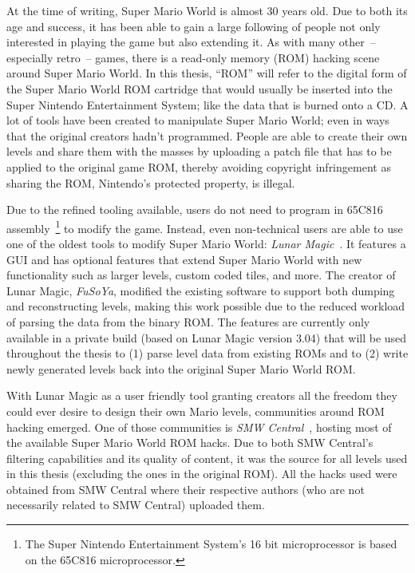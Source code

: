 At the time of writing, Super Mario World is almost 30 years old. Due
to both its age and success, it has been able to gain a large
following of people not only interested in playing the game but also
extending it. As with many other~-- especially retro~-- games, there
is a read-only memory (ROM) hacking scene around Super Mario World. In
this thesis, ``ROM'' will refer to the digital form of the Super Mario
World ROM cartridge that would usually be inserted into the Super
Nintendo Entertainment System; like the data that is burned onto a CD.
A lot of tools have been created to manipulate Super Mario World; even
in ways that the original creators hadn't programmed. People are able
to create their own levels and share them with the masses by uploading
a patch file that has to be applied to the original game ROM, thereby
avoiding copyright infringement as sharing the ROM, Nintendo's
protected property, is illegal.

Due to the refined tooling available, users do not need to program in
65C816 assembly~\footnote{The Super Nintendo Entertainment System's 16
  bit microprocessor is based on the 65C816 microprocessor.} to modify
the game. Instead, even non-technical users are able to use one of the
oldest tools to modify Super Mario World: \emph{Lunar
  Magic}~\cite{FuSoYaNicheLunar}. It features a GUI and has optional
features that extend Super Mario World with new functionality such as
larger levels, custom coded tiles, and more. The creator of Lunar
Magic, \emph{FuSoYa}, modified the existing software to support both
dumping and reconstructing levels, making this work possible due to
the reduced workload of parsing the data from the binary ROM. The
features are currently only available in a private build (based on
Lunar Magic version 3.04) that will be used throughout the thesis to
(1) parse level data from existing ROMs and to (2) write newly
generated levels back into the original Super Mario World ROM.

With Lunar Magic as a user friendly tool granting creators all the
freedom they could ever desire to design their own Mario levels,
communities around ROM hacking emerged. One of those communities is
\emph{SMW Central}~\cite{SMWCentralYour}, hosting most of the
available Super Mario World ROM hacks. Due to both SMW Central's
filtering capabilities and its quality of content, it was the source
for all levels used in this thesis (excluding the ones in the original
ROM). All the hacks used were obtained from SMW Central where their
respective authors (who are not necessarily related to SMW Central)
uploaded them.

